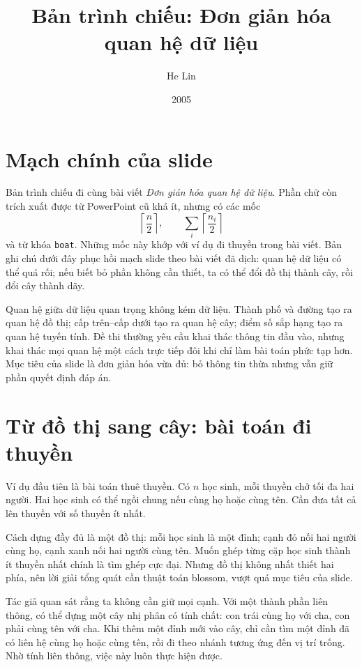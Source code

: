 \documentclass[11pt]{article}
\title{Bản trình chiếu: Đơn giản hóa quan hệ dữ liệu}
\author{He Lin}
\date{2005}
\begin{document}
\maketitle


\section{Mạch chính của slide}

Bản trình chiếu đi cùng bài viết \emph{Đơn giản hóa quan hệ dữ liệu}. Phần
chữ còn trích xuất được từ PowerPoint cũ khá ít, nhưng có các mốc
\[
  \left\lceil\frac n2\right\rceil,\qquad
  \sum_i\left\lceil\frac{n_i}{2}\right\rceil
\]
và từ khóa \texttt{boat}. Những mốc này khớp với ví dụ đi thuyền trong bài
viết. Bản ghi chú dưới đây phục hồi mạch slide theo bài viết đã dịch: quan hệ
dữ liệu có thể quá rối; nếu biết bỏ phần không cần thiết, ta có thể đổi đồ
thị thành cây, rồi đổi cây thành dãy.

Quan hệ giữa dữ liệu quan trọng không kém dữ liệu. Thành phố và đường tạo ra
quan hệ đồ thị; cấp trên--cấp dưới tạo ra quan hệ cây; điểm số sắp hạng tạo ra
quan hệ tuyến tính. Đề thi thường yêu cầu khai thác thông tin đầu vào, nhưng
khai thác mọi quan hệ một cách trực tiếp đôi khi chỉ làm bài toán phức tạp
hơn. Mục tiêu của slide là đơn giản hóa vừa đủ: bỏ thông tin thừa nhưng vẫn
giữ phần quyết định đáp án.

\section{Từ đồ thị sang cây: bài toán đi thuyền}

Ví dụ đầu tiên là bài toán thuê thuyền. Có \(n\) học sinh, mỗi thuyền chở tối
đa hai người. Hai học sinh có thể ngồi chung nếu cùng họ hoặc cùng tên. Cần
đưa tất cả lên thuyền với số thuyền ít nhất.

Cách dựng đầy đủ là một đồ thị: mỗi học sinh là một đỉnh; cạnh đỏ nối hai
người cùng họ, cạnh xanh nối hai người cùng tên. Muốn ghép từng cặp học sinh
thành ít thuyền nhất chính là tìm ghép cực đại. Nhưng đồ thị không nhất thiết
hai phía, nên lời giải tổng quát cần thuật toán blossom, vượt quá mục tiêu của
slide.

Tác giả quan sát rằng ta không cần giữ mọi cạnh. Với một thành phần liên thông,
có thể dựng một cây nhị phân có tính chất: con trái cùng họ với cha, con phải
cùng tên với cha. Khi thêm một đỉnh mới vào cây, chỉ cần tìm một đỉnh đã có
liên hệ cùng họ hoặc cùng tên, rồi đi theo nhánh tương ứng đến vị trí trống.
Nhờ tính liên thông, việc này luôn thực hiện được.
\end{document}
